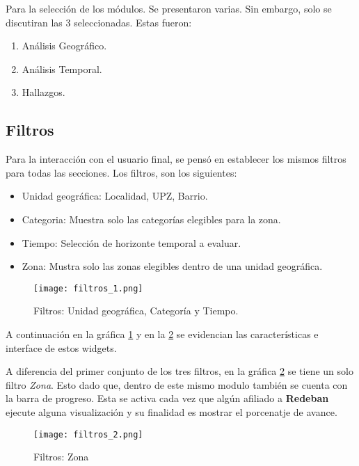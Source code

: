 \documentclass[a4paper]{article}
\begin{document}
Para la selección de los módulos. Se presentaron varias. Sin embargo, solo se discutiran las 3 seleccionadas. Estas fueron:

\begin{enumerate}
	\item Análisis Geográfico.
	\item Análisis Temporal.
	\item Hallazgos.
\end{enumerate}

\subsection{Filtros}

Para la interacción con el usuario final, se pensó en establecer los mismos filtros para todas las secciones. Los filtros, son los siguientes:

\begin{itemize}
	\item Unidad geográfica: Localidad, UPZ, Barrio.
	\item Categoria: Muestra solo las categorías elegibles para la zona.
	\item Tiempo: Selección de horizonte temporal a evaluar.
	\item Zona: Mustra solo las zonas elegibles dentro de una unidad geográfica.
\end{itemize}

\begin{figure}[h]
    \centering
	\texttt{[image: filtros\_1.png]}
    \caption{Filtros: Unidad geográfica, Categoría y Tiempo.}
    \label{fig:filtros_1}
\end{figure}

A continuación en la gráfica \ref{fig:filtros_1} y en la \ref{fig:filtros_2} se evidencian las características e interface de estos widgets.

A diferencia del primer conjunto de los tres filtros, en la gráfica \ref{fig:filtros_2} se tiene un solo filtro \textit{Zona}. Esto dado que, dentro de este mismo modulo también se cuenta con la barra de progreso. Esta se activa cada vez que algún afiliado a \textbf{Redeban} ejecute alguna visualización y su finalidad es mostrar el porcenatje de avance.

\begin{figure}[h]
    \centering
	\texttt{[image: filtros\_2.png]}
    \caption{Filtros: Zona}
    \label{fig:filtros_2}
\end{figure}
\end{document}
